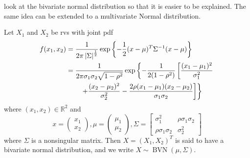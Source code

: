 \documentclass[notoc,notitlepage]{tufte-book}
\DeclareMathOperator{\BVN}{BVN }
\begin{document}
 look at the bivariate normal distribution so that it is easier to be explained. The same idea can be extended to a multivariate Normal distribution.

\begin{defn}
\label{defn:bivariate_normal_distribution}
    Let $X_1$ and $X_2$ be rvs with joint pdf
    \begin{align*}
      f(x_1, x_2)
        &= \frac{1}{2 \pi \left|\Sigma\right|^{\frac{1}{2}}} \exp \left\{ - \frac{1}{2} ( x - \mu )^T \Sigma^{-1} (x - \mu) \right\} \\
        &= \frac{1}{2 \pi \sigma_1 \sigma_2 \sqrt{ 1 - \rho^2 }} \exp \left\{ - \frac{1}{2( 1 - \rho^2 )} \left[ \frac{(x_1 - \mu_1)^2}{\sigma_1^2} \right. \right. \\
        &\qquad \left. \left. + \frac{(x_2 - \mu_2)^2}{\sigma_2^2} - \frac{2 \rho (x_1 - \mu_1)(x_2 - \mu_2)}{\sigma_1 \sigma_2} \right] \right\}
    \end{align*}
    where $(x_1, x_2) \in \mathbb{R}^2$ and
    \begin{equation*}
      x = \begin{pmatrix} x_1 \\ x_2 \end{pmatrix}, \mu = \begin{pmatrix} \mu_1 \\ \mu_2 \end{pmatrix}, \Sigma = \begin{bmatrix}
        \sigma_1^2 & \rho \sigma_1 \sigma_2 \\
        \rho \sigma_1 \sigma_2 & \sigma_2^2
      \end{bmatrix}
    \end{equation*}
    where $\Sigma$ is a nonsingular matrix. Then $X = (X_1, X_2)^T$ is said to have a bivariate normal distribution, and we write $X \sim \BVN(\mu, \Sigma)$.
\end{defn}
\end{document}
